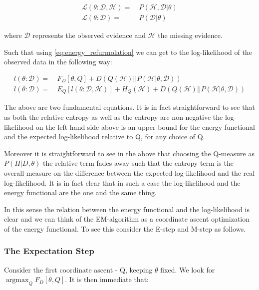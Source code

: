 \documentclass[11pt]{article}
\begin{document}
\begin{article}
\begin{align} \label{eq:likelihood_particle}
\mathscr{L} (\theta: \mathscr{D}, \mathscr{H}) =& \  P (\mathscr{H}, \mathscr{D}| \theta)\\
\mathscr{L} (\theta: \mathscr{D}) =& \ P (\mathscr{D}| \theta)
\end{align}

where \(\mathscr{D}\) represents the observed evidence and
\(\mathscr{H}\) the missing evidence.

Such that using \ref{eq:energy_refurmolation} we can get to the
log-likelihood of the observed data in the following way:

\begin{align} \label{eq:likelihood_energy_functional_relation}
l (\theta: \mathscr{D}) =& \  F_D[\theta, Q] + D (Q (\mathscr{H}) || P (\mathscr{H}| \theta, \mathscr{D})) \\
l (\theta: \mathscr{D}) =& \  E_Q[l (\theta: \mathscr{D}, \mathscr{H})]+ H_Q (\mathscr {H}) + D (Q (\mathscr{H}) || P (\mathscr{H}| \theta, \mathscr{D}))
\end{align}

The above are two fundamental equations. It is in fact
straightforward to see that as both the relative entropy as well as
the entropy are non-negative the log-likelihood on the left hand
side above is an upper bound for the energy functional and the expected
log-likelihood relative to Q, for any choice of Q.

Moreover it is straightforward to see in the above that choosing the
Q-measure as \(P (H| D, \theta)\) the relative term
fades away such that the entropy term is the overall measure on the
difference between the expected log-likelihood and the real
log-likelihood. It is in fact clear that in such a case the
log-likelihood and the energy functional are the one and the same
thing.

In this sense the relation between the energy functional and the
log-likelihood is clear and we can think of the EM-algorithm as a
coordinate ascent optimization of the energy functional. To see this
consider the E-step and M-step as follows.

\subsubsection{The Expectation Step}
\label{sec:org39e1c13}

Consider the first coordinate ascent - Q, keeping \(\theta\)
fixed. We look for \(\operatorname*{argmax}_{Q} F_D[\theta, Q]\). It
is then immediate that:


\end{article}
\end{document}
